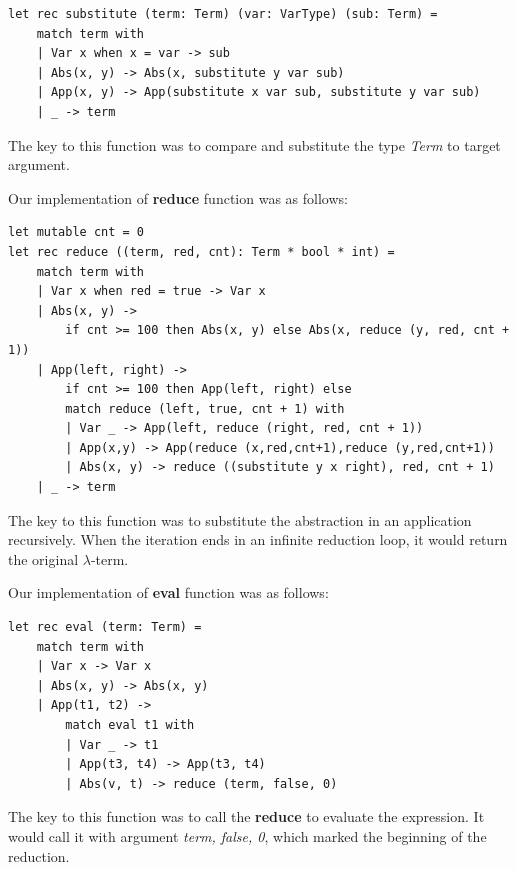 \documentclass{article}
\begin{document}
\begin{lstlisting}
let rec substitute (term: Term) (var: VarType) (sub: Term) =
    match term with
    | Var x when x = var -> sub
    | Abs(x, y) -> Abs(x, substitute y var sub)
    | App(x, y) -> App(substitute x var sub, substitute y var sub)
    | _ -> term
\end{lstlisting}

The key to this function was to compare and substitute the type \emph{Term} to target argument.


Our implementation of \textbf{reduce} function was as follows:

\begin{lstlisting}
let mutable cnt = 0
let rec reduce ((term, red, cnt): Term * bool * int) =
    match term with
    | Var x when red = true -> Var x
    | Abs(x, y) -> 
        if cnt >= 100 then Abs(x, y) else Abs(x, reduce (y, red, cnt + 1))
    | App(left, right) -> 
        if cnt >= 100 then App(left, right) else
        match reduce (left, true, cnt + 1) with
        | Var _ -> App(left, reduce (right, red, cnt + 1))
        | App(x,y) -> App(reduce (x,red,cnt+1),reduce (y,red,cnt+1))
        | Abs(x, y) -> reduce ((substitute y x right), red, cnt + 1)
    | _ -> term
\end{lstlisting}

The key to this function was to substitute the abstraction in an application recursively. When the iteration ends in an infinite reduction loop, it would return the original $\lambda$-term.

Our implementation of \textbf{eval} function was as follows:

\begin{lstlisting}
let rec eval (term: Term) =
    match term with
    | Var x -> Var x
    | Abs(x, y) -> Abs(x, y)
    | App(t1, t2) ->
        match eval t1 with
        | Var _ -> t1
        | App(t3, t4) -> App(t3, t4)
        | Abs(v, t) -> reduce (term, false, 0)
\end{lstlisting}

The key to this function was to call the \textbf{reduce} to evaluate the expression. It would call it with argument \emph{term, false, 0}, which marked the beginning of the reduction.
\end{document}

